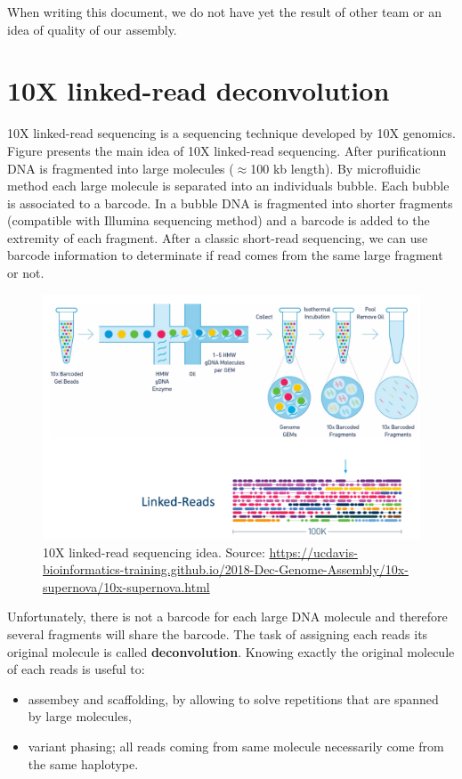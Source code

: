 \documentclass[main.tex]{subfiles}
\begin{document}
When writing this document, we do not have yet the result  of other team or an idea of quality of our assembly.

\section{10X linked-read deconvolution} \label{section:other_contribution:10x}

10X linked-read sequencing is a sequencing technique developed by 10X genomics. Figure \label{fig:other_contribution:10x} presents the main idea of 10X linked-read sequencing. After purificationn DNA is fragmented into large molecules ($\approx$100 kb length). By microfluidic method each large molecule is separated into an individuals bubble. Each bubble is associated to a barcode. In a bubble DNA is fragmented into shorter fragments (compatible with Illumina sequencing method) and a barcode is added to the extremity of each fragment. After a classic short-read sequencing, we can use barcode information to determinate if read comes from the same large fragment or not.

\begin{figure}
    \centering
    \includegraphics[width=\textwidth]{other_contribution/images/Linked_reads.png}
    \caption{10X linked-read sequencing idea. Source: \url{https://ucdavis-bioinformatics-training.github.io/2018-Dec-Genome-Assembly/10x-supernova/10x-supernova.html}}
    \label{fig:other_contribution:10x}
\end{figure}

Unfortunately, there is not a barcode for each large DNA molecule and therefore several fragments will share the barcode. The task of assigning each reads its original molecule is called \textbf{deconvolution}. Knowing exactly the original molecule of each reads is useful to: 
\begin{itemize}
    \item assembey and scaffolding, by allowing to solve repetitions that are spanned by large molecules,
    \item variant phasing; all reads coming from same molecule necessarily come from the same haplotype.
\end{itemize}
 
\end{document}
